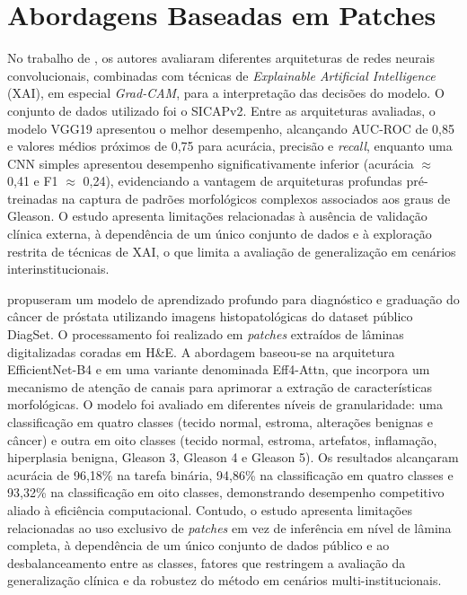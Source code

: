 \section{Abordagens Baseadas em Patches}

No trabalho de , os autores avaliaram diferentes arquiteturas de redes neurais convolucionais, combinadas com técnicas de \textit{Explainable Artificial Intelligence} (XAI), em especial \textit{Grad-CAM}, para a interpretação das decisões do modelo. O conjunto de dados utilizado foi o SICAPv2. Entre as arquiteturas avaliadas, o modelo VGG19 apresentou o melhor desempenho, alcançando AUC-ROC de 0{,}85 e valores médios próximos de 0{,}75 para acurácia, precisão e \textit{recall}, enquanto uma CNN simples apresentou desempenho significativamente inferior (acurácia $\approx$ 0{,}41 e F1 $\approx$ 0{,}24), evidenciando a vantagem de arquiteturas profundas pré-treinadas na captura de padrões morfológicos complexos associados aos graus de Gleason. O estudo apresenta limitações relacionadas à ausência de validação clínica externa, à dependência de um único conjunto de dados e à exploração restrita de técnicas de XAI, o que limita a avaliação de generalização em cenários interinstitucionais.


 propuseram um modelo de aprendizado profundo para diagnóstico e graduação do câncer de próstata utilizando imagens histopatológicas do dataset público DiagSet. O processamento foi realizado em \textit{patches} extraídos de lâminas digitalizadas coradas em H\&E. A abordagem baseou-se na arquitetura EfficientNet-B4 e em uma variante denominada Eff4-Attn, que incorpora um mecanismo de atenção de canais para aprimorar a extração de características morfológicas. O modelo foi avaliado em diferentes níveis de granularidade: uma classificação em quatro classes (tecido normal, estroma, alterações benignas e câncer) e outra em oito classes (tecido normal, estroma, artefatos, inflamação, hiperplasia benigna, Gleason 3, Gleason 4 e Gleason 5). Os resultados alcançaram acurácia de 96,18\% na tarefa binária, 94,86\% na classificação em quatro classes e 93,32\% na classificação em oito classes, demonstrando desempenho competitivo aliado à eficiência computacional. Contudo, o estudo apresenta limitações relacionadas ao uso exclusivo de \textit{patches} em vez de inferência em nível de lâmina completa, à dependência de um único conjunto de dados público e ao desbalanceamento entre as classes, fatores que restringem a avaliação da generalização clínica e da robustez do método em cenários multi-institucionais.

